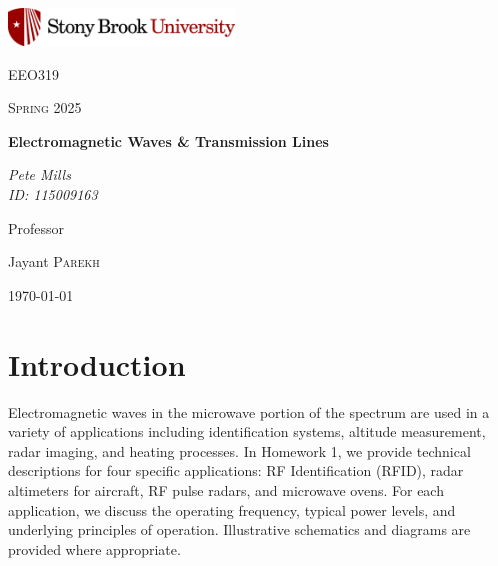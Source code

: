 \documentclass{article}
\begin{document}
	
\begin{titlepage}
	\centering
	\includegraphics[width=0.45\textwidth]{sbu}\par\vspace{1cm}
	{\LARGE \textsc{EEO319}\par}
	\vspace{1cm}
	{\Large \textsc{Spring 2025}\par}
	\vspace{1.5cm}
	{\huge\bfseries Electromagnetic Waves \& Transmission Lines\par}
	\vspace{2cm}
	{\Large\itshape Pete Mills\\ID: 115009163\par}
	\vfill
	Professor\par
	Jayant \textsc{Parekh}

	\vfill

	{\large \today\par}
\end{titlepage}

	\newcommand{\assName}{012825 Homework 1.pdf}

	
	
	

\section*{Introduction}
Electromagnetic waves in the microwave portion of the spectrum are used in a variety of applications including identification systems, altitude measurement, radar imaging, and heating processes. In Homework 1, we provide technical descriptions for four specific applications: RF Identification (RFID), radar altimeters for aircraft, RF pulse radars, and microwave ovens. For each application, we discuss the operating frequency, typical power levels, and underlying principles of operation. Illustrative schematics and diagrams are provided where appropriate.
\end{document}
